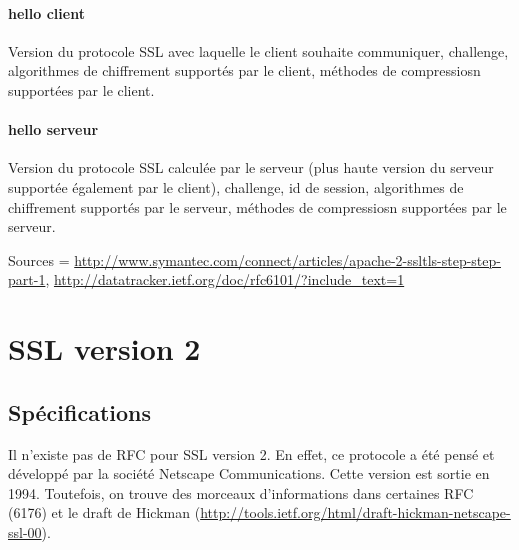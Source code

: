 \documentclass[a4paper,11pt,french]{article}
\begin{document}
\begin{center}
\end{center}

\paragraph{hello client}
Version du protocole SSL avec laquelle le client souhaite communiquer, challenge, algorithmes de chiffrement supportés par le client, méthodes de compressiosn supportées par le client.

\paragraph{hello serveur}
Version du protocole SSL calculée par le serveur (plus haute version du serveur supportée également par le client), challenge, id de session, algorithmes de chiffrement supportés par le serveur, méthodes de compressiosn supportées par le serveur.



Sources = \url{http://www.symantec.com/connect/articles/apache-2-ssltls-step-step-part-1}, \url{http://datatracker.ietf.org/doc/rfc6101/?include_text=1}

\pagebreak
\section{SSL version 2}
\subsection{Spécifications}
Il n'existe pas de RFC pour SSL version 2. En effet, ce protocole a été pensé et développé par la société Netscape Communications. Cette version est sortie en 1994. Toutefois, on trouve des morceaux d'informations dans certaines RFC (6176) et le draft de Hickman (\url{http://tools.ietf.org/html/draft-hickman-netscape-ssl-00}).
\end{document}
